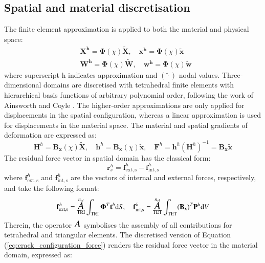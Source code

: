 \documentclass[11pt]{ACMEarticle}
\DeclareMathOperator*{\aoperator}{\text{\Large $A$}}
\numberwithin{equation}{section}
\begin{document}
\subsection{Spatial and material discretisation}
The finite element approximation is applied to both the material and physical space:
\begin{equation}
\begin{aligned}
& \mathbf{ X^h} = \mathbf \Phi(\chi) \mathbf{\tilde X}, \quad \mathbf{x^h} = \mathbf{\Phi}(\chi)\mathbf{\tilde x}  \\
& \mathbf{ W^h} = \mathbf \Phi(\chi) \mathbf{\tilde W}, \quad \mathbf{w^h} = \mathbf{\Phi}(\chi)\mathbf{\tilde w}
\end{aligned}
\end{equation}
where superscript h indicates approximation and $(\tilde \cdot)$ nodal values. Three-dimensional domains are discretised with tetrahedral finite elements with hierarchical basis functions of arbitrary polynomial order, following the work of Ainsworth and Coyle \citep{Ainsworth2003}. The higher-order approximations are only applied for displacements in the spatial configuration, whereas a linear approximation is used for displacements in the material space. The material and spatial gradients of deformation are expressed as:
\begin{equation}
\mathbf H^h = \mathbf{B_x}(\chi) \mathbf{\tilde X}, \quad \mathbf h^h = \mathbf{B_x} (\chi) \mathbf{\tilde x}, \quad \mathbf F^h = \mathbf h^h (\mathbf H^h)^{-1} = \mathbf{B_x} \mathbf{\tilde x}
\end{equation}
The residual force vector in spatial domain has the classical form:
\begin{equation}
\mathbf r_s^h = \mathbf f_\mathrm{{ext,s}}^h - \mathbf f_\mathrm{{int,s}}^h
\end{equation}
where $\mathbf f_\mathrm{{ext,s}}^h $ and $  \mathbf f_\mathrm{{int,s}}^h$ are the vectors of internal and external forces, respectively, and take the following format:
\begin{equation}
\mathbf f_\mathrm{{ext,s}}^h = \aoperator_{\text{TRI}}^{n_{el}} \int_\text{TRI} \mathbf \Phi^T \mathbf t^h \mathrm d S, \quad \mathbf f_\mathrm{{int,s}}^h = \aoperator_{\text{TET}}^{n_{el}} \int_\text{TET}  (\mathbf{ B_x})^T \mathbf{P}^h \mathrm d V
\end{equation}
Therein, the operator $ \aoperator$ symbolises the assembly of all contributions for tetrahedral and triangular elements. The discretised version of Equation (\ref{eq:crack_configuration_force}) renders the residual force vector in the material domain, expressed as:
\end{document}
